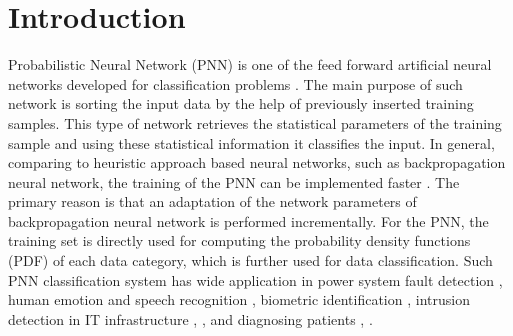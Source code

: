 \documentclass[sigconf]{acmart}
\begin{document}
\section{Introduction}
Probabilistic Neural Network (PNN) is one of the feed forward artificial neural networks developed for classification problems \cite{specht1990probabilistic}. The main purpose of such network is sorting the input data by the help of previously inserted training samples. This type of network retrieves the statistical parameters of the training sample and using these statistical information it classifies the input. In general, comparing to heuristic approach based neural networks, such as backpropagation neural network, the training of the PNN can be implemented faster \cite{specht1990probabilistic}. The primary reason is that an adaptation of the network parameters of backpropagation neural network is performed incrementally. For the PNN, the training set is directly used for computing the probability density functions (PDF) of each data category, which is further used for data classification. Such PNN classification system has wide application in power system fault detection \cite{mishra2016classification}, human emotion \cite{zhang2016pnn} and speech recognition \cite{wrobel2017using}, biometric identification \cite{junjea2015dynamic}, intrusion detection in IT infrastructure \cite{raman2017hypergraph}, \cite{zhao2017intrusion}, and diagnosing patients \cite{mangayarkarasi2017pnn}, \cite{thara2016brain}.
\end{document}
